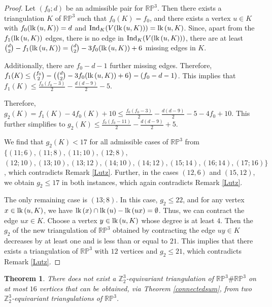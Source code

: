 \documentclass[11pt]{amsart}
\numberwithin{equation}{section}
\newtheorem{theorem}{Theorem}[section]
\theoremstyle{definition}
\newcommand{\lk}{\mbox{\upshape lk}\,}
\begin{document}
\begin{proof}
Let $(f_0;d)$ be an admissible pair for $\mathbb{RP}^3$. Then there exists a triangulation $K$ of $\mathbb{RP}^3$ such that $f_0(K)=f_0$, and there exists a vertex $u\in K$ with $f_0(\lk(u,K))=d$ and $\mathrm{Ind}_K(V(\lk(u,K)))=\lk(u,K)$. Since, apart from the $f_1(\lk(u,K))$ edges, there is no edge in $\mathrm{Ind}_K(V(\lk(u,K)))$, there are at least $\binom{d}{2}-f_1(\lk(u,K))=\binom{d}{2}-3f_0(\lk(u,K))+6$ missing edges in $K$.

Additionally, there are $f_0-d-1$ further missing edges. Therefore,
$f_1(K)\leq \binom{f_0}{2}-\big(\binom{d}{2}-3f_0(\lk(u,K))+6\big)-(f_0-d-1)$.
This implies that
$f_1(K)\leq \frac{f_0(f_0-3)}{2}-\frac{d(d-9)}{2}-5$.

Therefore,
$g_2(K)=f_1(K)-4f_0(K)+10\leq \frac{f_0(f_0-3)}{2}-\frac{d(d-9)}{2}-5-4f_0+10$.
This further simplifies to
$g_2(K)\leq \frac{f_0(f_0-11)}{2}-\frac{d(d-9)}{2}+5$.

We find that $g_2(K)<17$ for all admissible cases of $\mathbb{RP}^3$ from $\{(11;6),(11;8),(11;10),(12;8),$ $(12;10),(13;10),(13;12),(14;10),(14;12),(15;14),(16;14),(17;16)\}$, which contradicts Remark \ref{Lutz}. Further, in the cases $(12,6)$ and $(15,12)$, we obtain $g_2\leq 17$ in both instances, which again contradicts Remark \ref{Lutz}.

The only remaining case is $(13;8)$. In this case, $g_2\leq 22$, and for any vertex $x\in \lk(u,K)$, we have $\lk(x)\cap\lk(u)-\lk(ux)=\emptyset$. Thus, we can contract the edge $ux\in K$. Choose a vertex $y\in \lk(u,K)$ whose degree is at least $4$. Then the $g_2$ of the new triangulation of $\mathbb{RP}^3$ obtained by contracting the edge $uy\in K$ decreases by at least one and is less than or equal to $21$. This implies that there exists a triangulation of $\mathbb{RP}^3$ with $12$ vertices and $g_2\leq 21$, which contradicts Remark \ref{Lutz}.  
\end{proof}

\begin{theorem}
There does not exist a $\mathbb{Z}_2^3$-equivariant triangulation of $\mathbb{RP}^3\#\mathbb{RP}^3$ on at most $16$ vertices that can be obtained, via Theorem \ref{connectedsum}, from two $\mathbb{Z}_2^3$-equivariant triangulations of $\mathbb{RP}^3$.
\end{theorem}
\end{document}
